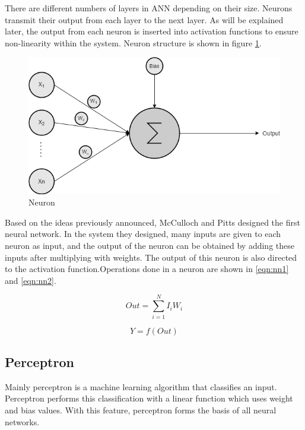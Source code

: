 There are different numbers of layers in ANN depending on their size. Neurons transmit their output from each layer to the next layer. As will be explained later, the output from each neuron is inserted into activation functions to ensure non-linearity within the system. Neuron structure is shown in figure \ref{fig:neuron_drawl}.

\begin{figure}[h!]
    \centering
    \includegraphics[scale=0.5]{figures/chapter3/neuron.png}
    \caption{Neuron}
    \label{fig:neuron_drawl}
\end{figure}

Based on the ideas previously announced, McCulloch and Pitts designed the first neural network. In the system they designed, many inputs are given to each neuron as input, and the output of the neuron can be obtained by adding these inputs after multiplying with weights. The output of this neuron is also directed to the activation function.Operations done in a neuron are shown in \ref{eqn:nn1} and \ref{eqn:nn2}.

\begin{equation}
\label{eqn:nn1}
    Out = \sum\limits_{i=1}^{N}{I_i W_i}
\end{equation}

\begin{equation}
\label{eqn:nn2}
    Y = f(Out)
\end{equation}

\subsection{Perceptron}

Mainly perceptron is a machine learning algorithm that classifies an input. Perceptron performs this classification with a linear function which uses weight and bias values. With this feature, perceptron forms the basis of all neural networks.

